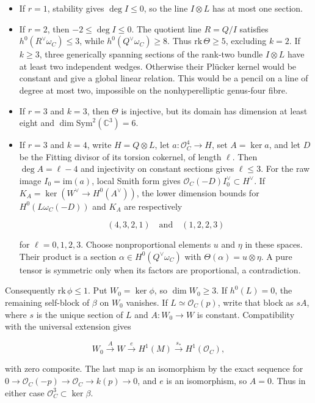 \documentclass[11pt]{article}
\theoremstyle{definition}
\begin{document}
\begin{itemize}
\item
  If \(r=1\), stability gives \(\deg I\le0\), so the line \(I\otimes L\)
  has at most one section.
\item
  If \(r=2\), then \(-2\le\deg I\le0\). The quotient line \(R=Q/I\)
  satisfies \(h^0(R^\vee\omega_C)\le3\), while
  \(h^0(Q^\vee\omega_C)\ge8\). Thus \(\mathrm{rk}\,\Theta\ge5\),
  excluding \(k=2\). If \(k\ge3\), three generically spanning sections
  of the rank-two bundle \(I\otimes L\) have at least two independent
  wedges. Otherwise their Pl\"ucker kernel would be constant and give a
  global linear relation. This would be a pencil on a line of degree at
  most two, impossible on the nonhyperelliptic genus-four fibre.
\item
  If \(r=3\) and \(k=3\), then \(\Theta\) is injective, but its domain
  has dimension at least eight and
  \(\dim\mathrm{Sym}^2(\mathbb C^3)=6\).
\item
  If \(r=3\) and \(k=4\), write \(H=Q\otimes L\), let
  \(a:\mathcal O_C^4\to H\), set \(A=\ker a\), and let \(D\) be the
  Fitting divisor of its torsion cokernel, of length \(\ell\). Then
  \(\deg A=\ell-4\) and injectivity on constant sections gives
  \(\ell\le3\). For the raw image \(I_0=\mathrm{im}(a)\), local Smith
  form gives \(\mathcal O_C(-D)I_0^\vee\subset H^\vee\). If
  \(K_A=\ker(W^\vee\to H^0(A^\vee))\), the lower dimension bounds for
  \(H^0(L\omega_C(-D))\) and \(K_A\) are respectively

  \[(4,3,2,1)\quad\text{and}\quad(1,2,2,3)\]

  for \(\ell=0,1,2,3\). Choose nonproportional elements \(u\) and
  \(\eta\) in these spaces. Their product is a section
  \(\alpha\in H^0(Q^\vee\omega_C)\) with
  \(\Theta(\alpha)=u\otimes\eta\). A pure tensor is symmetric only when
  its factors are proportional, a contradiction.
\end{itemize}

Consequently \(\mathrm{rk}\,\phi\le1\). Put \(W_0=\ker\phi\), so
\(\dim W_0\ge3\). If \(h^0(L)=0\), the remaining self-block of \(\beta\)
on \(W_0\) vanishes. If \(L\simeq\mathcal O_C(p)\), write that block as
\(sA\), where \(s\) is the unique section of \(L\) and \(A:W_0\to W\) is
constant. Compatibility with the universal extension gives

\[W_0\xrightarrow{A}W\xrightarrow{e}H^1(M)
\xrightarrow{s_*}H^1(\mathcal O_C),\]

with zero composite. The last map is an isomorphism by the exact
sequence for \(0\to\mathcal O_C(-p)\to\mathcal O_C\to k(p)\to0\), and
\(e\) is an isomorphism, so \(A=0\). Thus in either case
\(\mathcal O_C^3\subset\ker\beta\).
\end{document}
